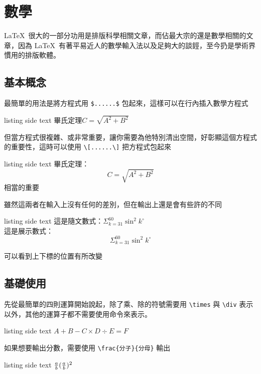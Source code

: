 \chapter{數學}

\LaTeX\ 很大的一部分功用是排版科學相關文章，而佔最大宗的還是數學相關的文章，因為 \LaTeX\ 有著平易近人的數學輸入法以及足夠大的談鋞，至今扔是學術界慣用的排版軟體。

\section{基本概念}

最簡單的用法是將方程式用 \verb`$......$` 包起來，這樣可以在行內插入數學方程式

\begin{tcblisting}{listing side text}
畢氏定理$C =\sqrt{A^2 + B^2} $
\end{tcblisting}

但當方程式很複雜、或非常重要，讓你需要為他特別清出空間，好彰顯這個方程式的重要性，這時可以使用 \verb`\[......\]` 把方程式包起來

\begin{tcblisting}{listing side text}
畢氏定理：
\[C =\sqrt{A^2 + B^2}\]
相當的重要
\end{tcblisting}

雖然這兩者在輸入上沒有任何的差別，但在輸出上還是會有些許的不同

\begin{tcblisting}{listing side text}
這是隨文數式：$\Sigma^{60}_{k=31}\sin^2k^\circ$\\
這是展示數式：
\[ \Sigma^{60}_{k=31}\sin^2k^\circ \]
\end{tcblisting}

可以看到上下標的位置有所改變

\section{基礎使用}

先從最簡單的四則運算開始說起，除了乘、除的符號需要用 \verb`\times` 與 \verb`\div` 表示以外，其他的運算子都不需要使用命令來表示。

\begin{tcblisting}{listing side text}
$A + B - C \times D \div E = F$
\end{tcblisting}

如果想要輸出分數，需要使用 \verb`\frac{分子}{分母}` 輸出

\begin{tcblisting}{listing side text}
$\frac{a}{b}\\
(\frac{a}{b})^2$
\end{tcblisting}

